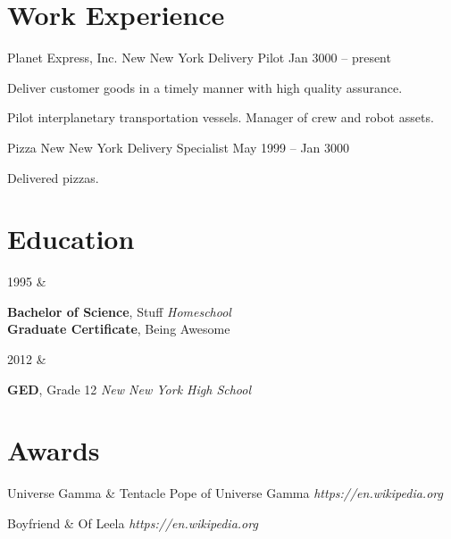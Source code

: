 \documentclass{article}
\begin{document}
  \section*{Work Experience}
    \WorkExperience
      {Planet Express, Inc.}
      {New New York}
      {Delivery Pilot}
      {Jan 3000 -- present}
      {
          \item Deliver customer goods in a timely manner with high quality assurance.

          \item Pilot interplanetary transportation vessels. Manager of crew and robot assets.
      }

    \WorkExperience
      {Pizza}
      {New New York}
      {Delivery Specialist}
      {May 1999 -- Jan 3000}
      {
          \item Delivered pizzas.
      }

  \bigskip

  \section*{Education}

      \begin{CvTable}
          1995 & \parbox[t]{0.85\textwidth}{%
              \textbf{Bachelor of Science}, Stuff \hfill \textit{Homeschool} \\\textbf{Graduate Certificate}, Being Awesome
          }
      \end{CvTable} %
      \begin{CvTable}
          2012 & \parbox[t]{0.85\textwidth}{%
              \textbf{GED}, Grade 12 \hfill \textit{New New York High School}
          }
      \end{CvTable}

  \bigskip

  \section*{Awards}

    \begin{CvTable}
    	Universe Gamma & Tentacle Pope of Universe Gamma \hfill \textit{https://en.wikipedia.org} \\
    \end{CvTable}\vspace{0.3em}
    \begin{CvTable}
    	Boyfriend & Of Leela \hfill \textit{https://en.wikipedia.org} \\
    \end{CvTable}
\end{document}
